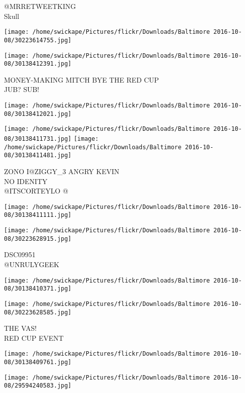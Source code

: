 \documentclass[10pt,letterpaper]{article}
\begin{document}
@MRRETWEETKING\\
Skull
\pagebreak

\texttt{[image: /home/swickape/Pictures/flickr/Downloads/Baltimore 2016-10-08/30223614755.jpg]}

\vspace{0.25in}
\texttt{[image: /home/swickape/Pictures/flickr/Downloads/Baltimore 2016-10-08/30138412391.jpg]}

MONEY{-}MAKING MITCH BYE THE RED CUP\\
JUB? SUB!
\pagebreak

\texttt{[image: /home/swickape/Pictures/flickr/Downloads/Baltimore 2016-10-08/30138412021.jpg]}

\vspace{0.25in}
\texttt{[image: /home/swickape/Pictures/flickr/Downloads/Baltimore 2016-10-08/30138411731.jpg]}
\texttt{[image: /home/swickape/Pictures/flickr/Downloads/Baltimore 2016-10-08/30138411481.jpg]}

ZONO I@ZIGGY\_3 ANGRY KEVIN\\
NO IDENITY\\
@ITSCORTEYLO @
\pagebreak

\texttt{[image: /home/swickape/Pictures/flickr/Downloads/Baltimore 2016-10-08/30138411111.jpg]}

\vspace{0.25in}
\texttt{[image: /home/swickape/Pictures/flickr/Downloads/Baltimore 2016-10-08/30223628915.jpg]}

DSC09951\\
@UNRULYGEEK
\pagebreak

\texttt{[image: /home/swickape/Pictures/flickr/Downloads/Baltimore 2016-10-08/30138410371.jpg]}

\vspace{0.25in}
\texttt{[image: /home/swickape/Pictures/flickr/Downloads/Baltimore 2016-10-08/30223628585.jpg]}

THE VAS!\\
RED CUP EVENT
\pagebreak

\texttt{[image: /home/swickape/Pictures/flickr/Downloads/Baltimore 2016-10-08/30138409761.jpg]}

\vspace{0.25in}
\texttt{[image: /home/swickape/Pictures/flickr/Downloads/Baltimore 2016-10-08/29594240583.jpg]}
\end{document}
